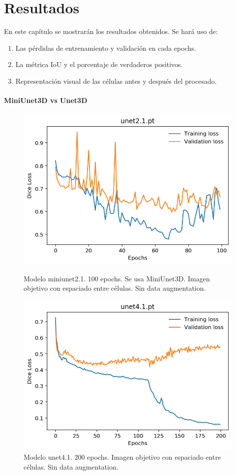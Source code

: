 \chapter{Resultados}\label{pruebas}

En este capítulo se mostrarán los resultados obtenidos. Se hará uso de:
\begin{enumerate}
\item Las pérdidas de entrenamiento y validación en cada epochs.
\item La métrica IoU y el porcentaje de verdaderos positivos.
\item Representación visual de las células antes y después del procesado.
\end{enumerate}

\clearpage \subsubsection{MiniUnet3D vs Unet3D}
\begin{figure}[ht]
\centering
\includegraphics[scale=0.8]{img/unet2.1 100.png} 
\caption{Modelo miniunet2.1. 100 epochs. Se usa MiniUnet3D. Imagen objetivo con espaciado entre células. Sin data augmentation.}
\includegraphics[scale=0.8]{img/unet4.1-200e-LQNOB-norm-Znorm.png} 
\caption{Modelo unet4.1. 200 epochs. Imagen objetivo con espaciado entre células. Sin data augmentation.}
\bigskip 
\end{figure}

